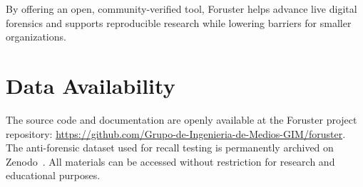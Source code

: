 \documentclass[preprint,12pt,a4paper]{elsarticle}
\begin{document}
By offering an open, community-verified tool, Foruster helps advance live digital forensics and supports reproducible research while lowering barriers for smaller organizations.


\section*{Data Availability}

The source code and documentation are openly available at the Foruster project 
repository: \url{https://github.com/Grupo-de-Ingenieria-de-Medios-GIM/foruster}. 
The anti-forensic dataset used for recall testing is permanently archived on 
Zenodo~\cite{foruster_antiforensic_dataset}. All materials can be accessed 
without restriction for research and educational purposes.




\end{document}
